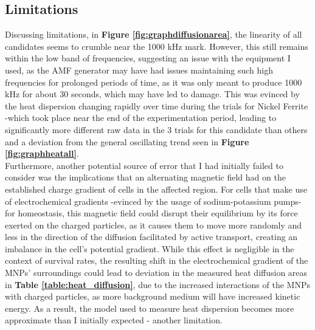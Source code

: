 \documentclass[12pt]{article}
\numberwithin{equation}{section}
\numberwithin{equation}{section}
\begin{document}
\subsection{Limitations}
{ Discussing limitations, in }\textbf{Figure \ref{fig:graphdiffusionarea}}, {the linearity of all candidates seems to crumble near the 1000 kHz mark. However, this still remains within the low band of frequencies, suggesting an issue with the equipment I used, as the AMF generator may have had issues maintaining such high frequencies for prolonged periods of time, as it was only meant to produce 1000 kHz for about 30 seconds, which may have led to damage.} This was evinced by the heat dispersion changing rapidly over time during the trials for Nickel Ferrite -which took place near the end of the experimentation period, leading to significantly more different raw data in the 3 trials for this candidate than others and a deviation from the general oscillating trend seen in \textbf{Figure \ref{fig:graphheatall}}. \\
{Furthermore, another potential source of error that I had initially failed to consider was the implications that an alternating magnetic field had on the established charge gradient of cells in the affected region. For cells that make use of electrochemical gradients -evinced by the usage of sodium-potassium pumps- for homeostasis, this magnetic field could disrupt their equilibrium by its force exerted on the charged particles, as it causes them to move more randomly and less in the direction of the diffusion facilitated by active transport, creating an imbalance in the cell's potential gradient.} While this effect is negligible in the context of survival rates, the resulting shift in the electrochemical gradient of the MNPs' surroundings could lead to deviation in the measured heat diffusion areas in \textbf{Table \ref{table:heat_diffusion}}, due to the increased interactions of the MNPs with charged particles, as more background medium will have increased kinetic energy. {As a result, the model used to measure heat dispersion becomes more approximate than I initially expected - another limitation.}\\
\end{document}
